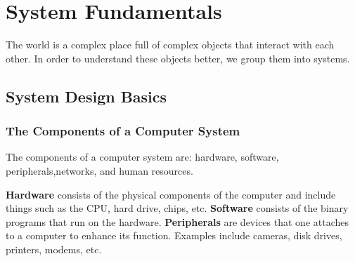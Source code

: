 \chapter{System Fundamentals}
The world is a complex place full of complex objects that interact with each other. In order to understand these objects better, we group them into systems.
\section{System Design Basics}

\subsection{The Components of a Computer System}
The components of a computer system are: hardware, software, peripherals,networks, and human resources.

\textbf{Hardware} consists of the physical components of the computer and include things such as the CPU, hard drive, chips, etc. \textbf{Software} consists of the binary programs that run on the hardware. \textbf{Peripherals} are devices that one attaches to a computer to enhance its function. Examples include cameras, disk drives, printers, modems, etc. 